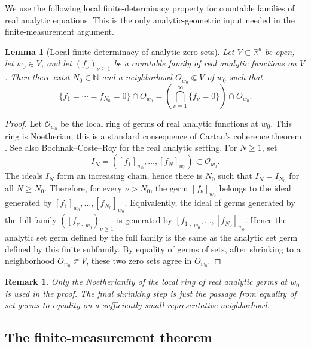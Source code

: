 \documentclass[12pt,oneside]{amsart}
\newtheorem{lemma}[theorem]{Lemma}
\newtheorem{remark}[theorem]{Remark}
\newcommand{\R}{\mathbb R}
\newcommand{\N}{\mathbb N}
\begin{document}
We use the following local finite-determinacy property for countable families of
real analytic equations.  This is the only analytic-geometric input needed in
the finite-measurement argument.

\begin{lemma}[Local finite determinacy of analytic zero sets]\label{lem:finite-zero-germ}
Let $V\subset\R^d$ be open, let $w_0\in V$, and let
$(f_\nu)_{\nu\ge1}$ be a countable family of real analytic functions on $V$.
Then there exist $N_0\in\N$ and a neighborhood $O_{w_0}\Subset V$ of $w_0$
such that
\[
        \{f_1=\cdots=f_{N_0}=0\}\cap O_{w_0}
        =
        \left(\bigcap_{\nu=1}^\infty\{f_\nu=0\}\right)\cap O_{w_0} .
\]
\end{lemma}

\begin{proof}
Let $\mathcal O_{w_0}$ be the local ring of germs of real analytic functions at
$w_0$.  This ring is Noetherian; this is a standard consequence of Cartan's
coherence theorem \cite{Cartan1950}.  See also Bochnak--Coste--Roy
\cite[Sec. 2.3]{BochnakCosteRoy1998} for the real analytic setting.  For
$N\ge1$, set
\[
        I_N=([f_1]_{w_0},\ldots,[f_N]_{w_0})\subset \mathcal O_{w_0}.
\]
The ideals $I_N$ form an increasing chain, hence there is $N_0$ such that
$I_N=I_{N_0}$ for all $N\ge N_0$.  Therefore, for every $\nu>N_0$, the germ
$[f_\nu]_{w_0}$ belongs to the ideal generated by
$[f_1]_{w_0},\ldots,[f_{N_0}]_{w_0}$.  Equivalently, the ideal of germs generated
by the full family $([f_\nu]_{w_0})_{\nu\ge1}$ is generated by
$[f_1]_{w_0},\ldots,[f_{N_0}]_{w_0}$.  Hence the analytic set germ defined by
the full family is the same as the analytic set germ defined by this finite
subfamily.  By equality of germs of sets, after shrinking to a neighborhood
$O_{w_0}\Subset V$, these two zero sets agree in $O_{w_0}$.
\end{proof}

\begin{remark}\label{rem:finite-zero-germ-local}
Only the Noetherianity of the local ring of real analytic germs at $w_0$ is used
in the proof.  The final shrinking step is just the passage from equality of set
germs to equality on a sufficiently small representative neighborhood.
\end{remark}

\subsection{The finite-measurement theorem}
\end{document}
